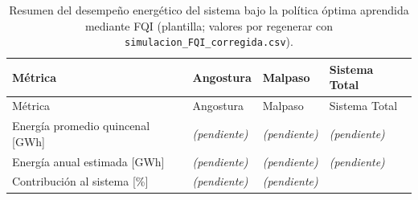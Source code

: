 \documentclass[
  spanish,
  letterpaper,
]{scrreprt}
\theoremstyle{definition}
\theoremstyle{remark}
\begin{document}
\begin{longtable}[]{@{}
  >{\raggedright\arraybackslash}p{}
  >{\raggedright\arraybackslash}p{}
  >{\raggedright\arraybackslash}p{}
  >{\raggedright\arraybackslash}p{}@{}}
\caption{Resumen del desempeño energético del sistema bajo la política
óptima aprendida mediante FQI (plantilla; valores por regenerar con
\protect\texttt{simulacion\_FQI\_corregida.csv}).}\tabularnewline
\toprule\noalign{}
\begin{minipage}[b]{\linewidth}\raggedright
Métrica
\end{minipage} & \begin{minipage}[b]{\linewidth}\raggedright
Angostura
\end{minipage} & \begin{minipage}[b]{\linewidth}\raggedright
Malpaso
\end{minipage} & \begin{minipage}[b]{\linewidth}\raggedright
Sistema Total
\end{minipage} \\
\midrule\noalign{}
\endfirsthead
\toprule\noalign{}
\begin{minipage}[b]{\linewidth}\raggedright
Métrica
\end{minipage} & \begin{minipage}[b]{\linewidth}\raggedright
Angostura
\end{minipage} & \begin{minipage}[b]{\linewidth}\raggedright
Malpaso
\end{minipage} & \begin{minipage}[b]{\linewidth}\raggedright
Sistema Total
\end{minipage} \\
\midrule\noalign{}
\endhead
\bottomrule\noalign{}
\endlastfoot
Energía promedio quincenal {[}GWh{]} & \emph{(pendiente)} &
\emph{(pendiente)} & \emph{(pendiente)} \\
Energía anual estimada {[}GWh{]} & \emph{(pendiente)} &
\emph{(pendiente)} & \emph{(pendiente)} \\
Contribución al sistema {[}\%{]} & \emph{(pendiente)} &
\emph{(pendiente)} & 100.0 \\
\end{longtable}
\end{document}
